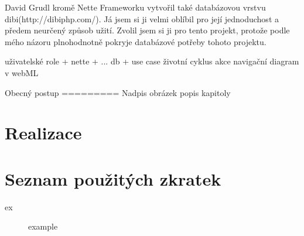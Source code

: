 \documentclass[thesis=B,czech]{FITthesis}[2011/06/14]
\begin{document}
David Grudl kromě Nette Frameworku vytvořil také databázovou vrstvu dibi(http://dibiphp.com/). Já jsem si ji velmi oblíbil pro její jednoduchost a předem neurčený způsob užití. Zvolil jsem si ji pro tento projekt, protože podle mého názoru plnohodnotně pokryje databázové potřeby tohoto projektu.






uživatelské role + nette + ...
db + use case
životní cyklus akce
navigační diagram v webML

 
Obecný postup
=========
Nadpis
obrázek
popis kapitoly


\chapter{Realizace}

\begin{conclusion}
\end{conclusion}




\appendix

\chapter{Seznam použitých zkratek}
\begin{description}
	\item[ex] example
\end{description}


% 
% 
% 
\end{document}

